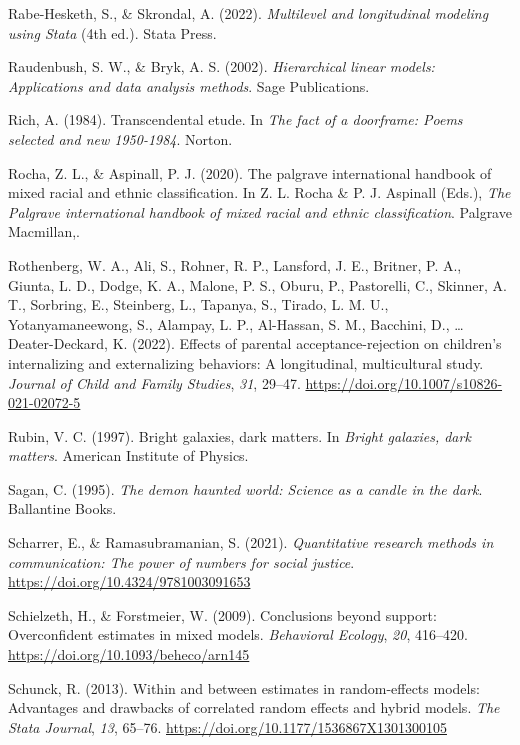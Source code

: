 \documentclass[
  letterpaper,
  DIV=11,
  numbers=noendperiod]{scrreprt}
\newlength{\cslhangindent}
\newenvironment{CSLReferences}[2] %
 {\begin{list}{}{%
  \setlength{\itemindent}{0pt}
  \setlength{\leftmargin}{0pt}
  \setlength{\parsep}{0pt}
  \ifodd #1
   \setlength{\leftmargin}{\cslhangindent}
   \setlength{\itemindent}{-1\cslhangindent}
  \fi
  \setlength{\itemsep}{#2\baselineskip}}}
 {\end{list}}
\begin{document}
\begin{CSLReferences}{1}{0}
Rabe-Hesketh, S., \& Skrondal, A. (2022). \emph{Multilevel and
longitudinal modeling using {S}tata} (4th ed.). Stata Press.

Raudenbush, S. W., \& Bryk, A. S. (2002). \emph{Hierarchical linear
models: Applications and data analysis methods}. Sage Publications.

Rich, A. (1984). Transcendental etude. In \emph{The fact of a doorframe:
Poems selected and new 1950-1984}. Norton.

Rocha, Z. L., \& Aspinall, P. J. (2020). The palgrave international
handbook of mixed racial and ethnic classification. In Z. L. Rocha \& P.
J. Aspinall (Eds.), \emph{The Palgrave international handbook of mixed
racial and ethnic classification}. Palgrave Macmillan,.

Rothenberg, W. A., Ali, S., Rohner, R. P., Lansford, J. E., Britner, P.
A., Giunta, L. D., Dodge, K. A., Malone, P. S., Oburu, P., Pastorelli,
C., Skinner, A. T., Sorbring, E., Steinberg, L., Tapanya, S., Tirado, L.
M. U., Yotanyamaneewong, S., Alampay, L. P., Al-Hassan, S. M., Bacchini,
D., \ldots{} Deater-Deckard, K. (2022). Effects of parental
acceptance-rejection on children's internalizing and externalizing
behaviors: A longitudinal, multicultural study. \emph{Journal of Child
and Family Studies}, \emph{31}, 29--47.
\url{https://doi.org/10.1007/s10826-021-02072-5}

Rubin, V. C. (1997). Bright galaxies, dark matters. In \emph{Bright
galaxies, dark matters}. American Institute of Physics.

Sagan, C. (1995). \emph{The demon haunted world: Science as a candle in
the dark}. Ballantine Books.

Scharrer, E., \& Ramasubramanian, S. (2021). \emph{Quantitative research
methods in communication: The power of numbers for social justice}.
\url{https://doi.org/10.4324/9781003091653}

Schielzeth, H., \& Forstmeier, W. (2009). Conclusions beyond support:
Overconfident estimates in mixed models. \emph{Behavioral Ecology},
\emph{20}, 416--420. \url{https://doi.org/10.1093/beheco/arn145}

Schunck, R. (2013). Within and between estimates in random-effects
models: Advantages and drawbacks of correlated random effects and hybrid
models. \emph{The Stata Journal}, \emph{13}, 65--76.
\url{https://doi.org/10.1177/1536867X1301300105}


\end{CSLReferences}
\end{document}
